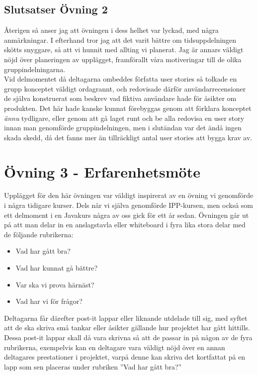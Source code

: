\documentclass[a4paper, titlepage,12pt]{article}
\begin{document}
			\subsection{Slutsatser Övning 2}

				Återigen så anser jag att övningen i dess helhet var lyckad, med några anmärkningar. I efterhand tror jag att det varit bättre om tidsuppdelningen skötts snyggare, så att vi hunnit med allting vi planerat. Jag är annars väldigt nöjd över planeringen av upplägget, framförallt våra motiveringar till de olika gruppindelningarna.\\

				Vid delmomentet då deltagarna ombeddes författa user stories så tolkade en grupp konceptet väldigt ordagrannt, och redovisade därför användarrecensioner de själva konstruerat som beskrev vad fiktiva användare hade för åsikter om produkten. Det här hade kanske kunnat förebyggas genom att förklara konceptet \emph{ännu} tydligare, eller genom att gå laget runt och be alla redovisa en user story innan man genomförde gruppindelningen, men i slutändan var det ändå ingen skada skedd, då det fanns mer än tillräckligt antal user stories att bygga krav av.

	\section{Övning 3 - Erfarenhetsmöte}

			Upplägget för den här övningen var väldigt inspirerat av en övning vi genomförde i några tidigare kurser. Dels när vi själva genomförde IPP-kursen, men också som ett delmoment i en Javakurs några av oss gick för ett år sedan. Övningen går ut på att man delar in en anslagstavla eller whiteboard i fyra lika stora delar med de följande rubrikerna:
			\begin{itemize}
				\item Vad har gått bra?
				\item Vad har kunnat gå bättre?
				\item Var ska vi prova härnäst?
				\item Vad har vi för frågor?
			\end{itemize}

			Deltagarna får därefter post-it lappar eller liknande utdelade till sig, med syftet att de ska skriva små tankar eller åsikter gällande hur projektet har gått hittills. Dessa post-it lappar skall då vara skrivna så att de passar in på någon av de fyra rubrikerna, exempelvis kan en deltagare vara väldigt nöjd över en annan deltagares prestationer i projektet, varpå denne kan skriva det kortfattat på en lapp som sen placeras under rubriken ''Vad har gått bra?'' 
\end{document}
